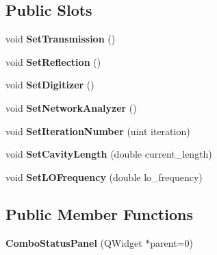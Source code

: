 \subsection*{Public Slots}
\begin{DoxyCompactItemize}
\item 
void {\bfseries Set\+Transmission} ()\hypertarget{class_combo_status_panel_a926b00ce9496c55077ac5719dcd7bdeb}{}\label{class_combo_status_panel_a926b00ce9496c55077ac5719dcd7bdeb}

\item 
void {\bfseries Set\+Reflection} ()\hypertarget{class_combo_status_panel_a8e949a09cf250c66c645d982eac012ef}{}\label{class_combo_status_panel_a8e949a09cf250c66c645d982eac012ef}

\item 
void {\bfseries Set\+Digitizer} ()\hypertarget{class_combo_status_panel_ad3c4a3aab45aa2663806805e7330e4be}{}\label{class_combo_status_panel_ad3c4a3aab45aa2663806805e7330e4be}

\item 
void {\bfseries Set\+Network\+Analyzer} ()\hypertarget{class_combo_status_panel_a276208d722c7173d801464bb9cd39f17}{}\label{class_combo_status_panel_a276208d722c7173d801464bb9cd39f17}

\item 
void {\bfseries Set\+Iteration\+Number} (uint iteration)\hypertarget{class_combo_status_panel_acd114441ad2cf073f9bd734369430a5b}{}\label{class_combo_status_panel_acd114441ad2cf073f9bd734369430a5b}

\item 
void {\bfseries Set\+Cavity\+Length} (double current\+\_\+length)\hypertarget{class_combo_status_panel_aa1894532aba11f13402781d260dcb82e}{}\label{class_combo_status_panel_aa1894532aba11f13402781d260dcb82e}

\item 
void {\bfseries Set\+L\+O\+Frequency} (double lo\+\_\+frequency)\hypertarget{class_combo_status_panel_a42fc2fc8fc9c24cdcb569ee12a70afb5}{}\label{class_combo_status_panel_a42fc2fc8fc9c24cdcb569ee12a70afb5}

\end{DoxyCompactItemize}
\subsection*{Public Member Functions}
\begin{DoxyCompactItemize}
\item 
{\bfseries Combo\+Status\+Panel} (Q\+Widget $\ast$parent=0)\hypertarget{class_combo_status_panel_affde893188d5ba0ea12133682543fddc}{}\label{class_combo_status_panel_affde893188d5ba0ea12133682543fddc}

\end{DoxyCompactItemize}


